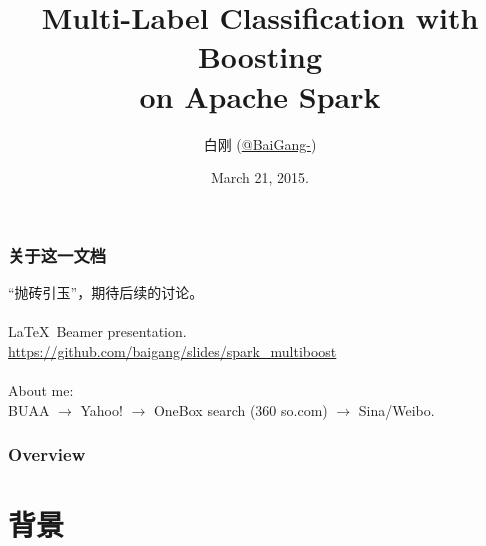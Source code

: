 \documentclass{beamer}
\title[MultiBoost]{Multi-Label Classification with Boosting \\ on Apache Spark}
\author{
白刚  (\href{http://weibo.com/baigang111}{@BaiGang-})
} %
\institute[Sina] %
{
\textit{Sina Ad-Algo}
}
\date{March 21, 2015.} %
\begin{document}
\begin{frame}
\titlepage %
\end{frame}

\begin{frame}
\frametitle{关于这一文档}
“抛砖引玉”，期待后续的讨论。 \\ \ \\

\LaTeX\  Beamer presentation.  \\
\url{https://github.com/baigang/slides/spark_multiboost} \\ \ \\

About me: \\
BUAA $\rightarrow$ Yahoo! $\rightarrow$ OneBox search (360 so.com) $\rightarrow$ Sina/Weibo.

\end{frame}

\begin{frame}
\frametitle{Overview} %
\tableofcontents %
\end{frame}



\section{背景}
\end{document}
